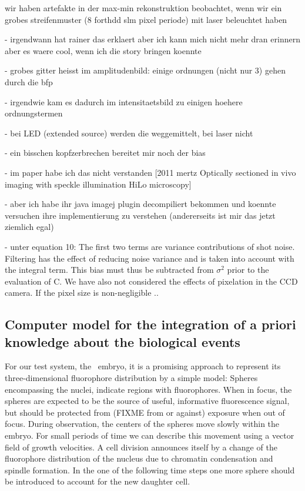 {\color{red} wir haben artefakte in der max-min rekonstruktion
  beobachtet, wenn wir ein grobes streifenmuster (8 forthdd slm pixel
  periode) mit laser beleuchtet haben

     - irgendwann hat rainer das erklaert aber ich kann mich nicht
       mehr dran erinnern aber es waere cool, wenn ich die story
       bringen koennte
     
- grobes gitter heisst im amplitudenbild: einige ordnungen (nicht
       nur 3) gehen durch die bfp

     - irgendwie kam es dadurch im intensitaetsbild zu einigen hoehere
       ordnungstermen

     - bei LED (extended source) werden die weggemittelt, bei laser
       nicht

       - ein bisschen kopfzerbrechen bereitet mir noch der bias 

       - im paper habe ich das nicht verstanden [2011 mertz Optically
       sectioned in vivo imaging with speckle illumination HiLo
       microscopy]

       - aber ich habe ihr java imagej plugin decompiliert bekommen
       und koennte versuchen ihre implementierung zu verstehen
       (andererseits ist mir das jetzt ziemlich egal)

       - unter equation 10: The first two terms are variance
       contributions of shot noise. Filtering has the effect of
       reducing noise variance and is taken into account with the
       integral term. This bias must thus be subtracted from
       $\sigma^2$ prior to the evaluation of C. We have also not
       considered the effects of pixelation in the CCD camera. If the
       pixel size is non-negligible ..  }

\subsection{Computer model for the integration of a priori knowledge
  about the biological events}
For our test system, the \celegans\ embryo, it is a promising approach
to represent its three-dimensional fluorophore distribution by a simple
model: Spheres encompassing the nuclei, indicate regions with fluorophores. When in focus, the
spheres are expected to be the source of useful, informative fluorescence signal,
but should be protected from (FIXME from or against) exposure when out of
focus. During observation, the centers of the spheres move
slowly within the embryo. For small periods of time we can describe
this movement using a vector field of growth velocities.  A cell
division announces itself by a change of the fluorophore distribution of the nucleus
due to chromatin condensation and spindle formation. In the one of the following time
steps one more sphere should be introduced to account for the new
daughter cell.

